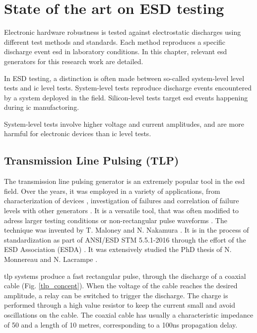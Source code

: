 \section{State of the art on ESD testing}
\label{sec:state-art-esd-testing}

Electronic hardware robustness is tested against electrostatic discharges using different test methods and standards.
Each method reproduces a specific discharge event \gls{esd} in laboratory conditions.
In this chapter, relevant \gls{esd} generators for this research work are detailed.

In ESD testing, a distinction is often made between so-called system-level level tests and \gls{ic} level tests.
System-level tests reproduce discharge events encountered by a system deployed in the field.
Silicon-level tests target \gls{esd} events happening during \gls{ic} manufactoring.

System-level tests involve higher voltage and current amplitudes, and are more harmful for electronic devices than \gls{ic} level tests.

\subsection{Transmission Line Pulsing (TLP)}

The transmission line pulsing generator is an extremely popular tool in the \gls{esd} field.
Over the years, it was employed in a variety of applications, from characterization of devices \cite{TLPforESDProtectionCz, TLPthroubleshooting}, investigation of failures \cite{tlp-application-1, tlp-application-2} and correlation of failure levels with other generators \cite{correlation-system-level-esd-tlp}.
It is a versatile tool, that was often modified to adress larger testing conditions \cite{tlp-power} or non-rectangular pulse waveforms \cite{tlp-based-hmm, my-publi-tlp-hmm}.
The technique was invented by T. Maloney and N. Nakamura \cite{TLP}.
It is in the process of standardization as part of ANSI/ESD STM 5.5.1-2016 \cite{tlp-standard} through the effort of the ESD Association (ESDA) \cite{esda}.
It was extensively studied the PhD thesis of N. Monnereau \cite{phd-monnereau} and N. Lacrampe \cite{phd-lacrampe}.

\gls{tlp} systems produce a fast rectangular pulse, through the discharge of a coaxial cable (Fig. \ref{tlp_concept}).
When the voltage of the cable reaches the desired amplitude, a relay can be switched to trigger the discharge.
The charge is performed through a high value resistor to keep the current small and avoid oscillations on the cable.
The coaxial cable has usually a characteristic impedance of 50\textOmega{} and a length of 10 metres, corresponding to a 100ns propagation delay.

